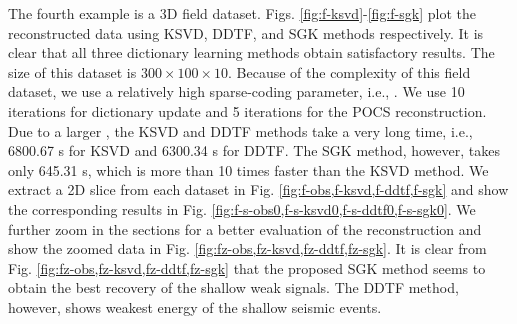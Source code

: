 The fourth example is a 3D field dataset.  Figs. \ref{fig:f-ksvd}-\ref{fig:f-sgk} plot the reconstructed data using KSVD, DDTF, and SGK methods respectively. It is clear that all three dictionary learning methods obtain satisfactory results. The size of this dataset is $300\times 100\times 10$. Because of the complexity of this field dataset, we use a relatively high sparse-coding parameter, i.e., . We use 10 iterations for dictionary update and 5 iterations for the POCS reconstruction. Due to a larger , the KSVD and DDTF methods take a very long time, i.e., 6800.67 s for KSVD and 6300.34 s for DDTF. The SGK method, however, takes only 645.31 s, which is more than 10 times faster than the KSVD method. We extract a 2D slice from each dataset in Fig. \ref{fig:f-obs,f-ksvd,f-ddtf,f-sgk} and show the corresponding results in Fig. \ref{fig:f-s-obs0,f-s-ksvd0,f-s-ddtf0,f-s-sgk0}. We further zoom in the sections for a better evaluation of the reconstruction and show the zoomed data in Fig. \ref{fig:fz-obs,fz-ksvd,fz-ddtf,fz-sgk}. It is clear from Fig. \ref{fig:fz-obs,fz-ksvd,fz-ddtf,fz-sgk} that the proposed SGK method seems to obtain the best recovery of the shallow weak signals. The DDTF method, however, shows weakest energy of the shallow seismic events. 


